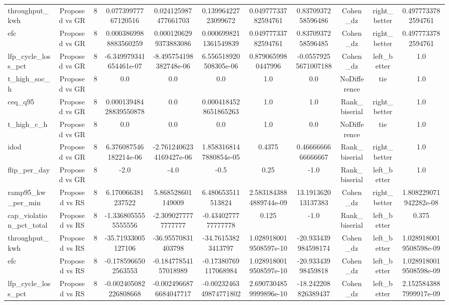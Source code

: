 \begin{table}[t]
\begin{tabular}{lcccccccccc}
throughput\_kwh & Proposed vs GR & 8 & 0.07739977767120516 & 0.024125987477661703 & 0.13996422723099672 & 0.04977733782594761 & 0.8370937258596486 & Cohen\_dz & right\_better & 0.4977733782594761 \\
efc & Proposed vs GR & 8 & 0.0003869988883560259 & 0.0001206299373883086 & 0.0006998211361549839 & 0.04977733782594761 & 0.8370937258596485 & Cohen\_dz & right\_better & 0.4977733782594761 \\
lfp\_cycle\_loss\_pct & Proposed vs GR & 8 & -6.349979341654461e-07 & -8.495754198382748e-06 & 6.556518920508305e-06 & 0.8790659980447996 & -0.05579255671007188 & Cohen\_dz & left\_better & 1.0 \\
t\_high\_soc\_h & Proposed vs GR & 8 & 0.0 & 0.0 & 0.0 & 1.0 & 0.0 & NoDifference & tie & 1.0 \\
ceq\_q95 & Proposed vs GR & 8 & 0.00013948428839550878 & 0.0 & 0.0004184528651865263 & 1.0 & 1.0 & Rank\_biserial & right\_better & 1.0 \\
t\_high\_c\_h & Proposed vs GR & 8 & 0.0 & 0.0 & 0.0 & 1.0 & 0.0 & NoDifference & tie & 1.0 \\
idod & Proposed vs GR & 8 & 6.376087546182214e-06 & -2.7612406234169427e-06 & 1.8583168147880854e-05 & 0.4375 & 0.4666666666666667 & Rank\_biserial & right\_better & 1.0 \\
flip\_per\_day & Proposed vs GR & 8 & -2.0 & -4.0 & -0.5 & 0.25 & -1.0 & Rank\_biserial & left\_better & 1.0 \\
ramp95\_kw\_per\_min & Proposed vs RS & 8 & 6.170066381237522 & 5.868528601149009 & 6.480653511513824 & 2.5831843884889744e-09 & 13.191362013137383 & Cohen\_dz & right\_better & 1.808229071942282e-08 \\
cap\_violation\_pct\_total & Proposed vs RS & 8 & -1.3368055555555556 & -2.3090277777777777 & -0.4340277777777778 & 0.125 & -1.0 & Rank\_biserial & left\_better & 0.375 \\
throughput\_kwh & Proposed vs RS & 8 & -35.71933005127106 & -36.95570831403798 & -34.76153823413797 & 1.0289180019508597e-10 & -20.933439984598174 & Cohen\_dz & left\_better & 1.0289180019508598e-09 \\
efc & Proposed vs RS & 8 & -0.1785966502563553 & -0.18477854157018989 & -0.17380769117068984 & 1.0289180019508597e-10 & -20.93343998459818 & Cohen\_dz & left\_better & 1.0289180019508598e-09 \\
lfp\_cycle\_loss\_pct & Proposed vs RS & 8 & -0.002405082226808668 & -0.0024966876684047717 & -0.0023246349874771802 & 2.6907304859999896e-10 & -18.242208826389437 & Cohen\_dz & left\_better & 2.1525843887999917e-09 \\

\end{tabular}
\end{table}
